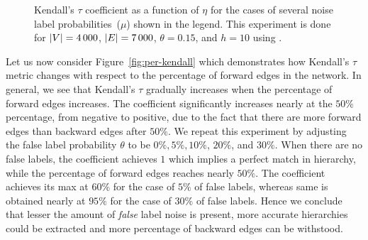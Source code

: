 \begin{figure}[t!]
\begin{center}
\setlength{\tabcolsep}{0pt}

\caption{Kendall's  $\tau$ coefficient  as a function of $\eta$  for the cases of several  noise label probabilities~($\mu$) shown in the legend. This experiment is done for  ${\left|V\right|}=4\,000$, ${\left|E\right|}=7\,000$, $\theta=0.15$, and $h=10$ using \algpartition.}
\label{fig:per-kendall-ind}
\end{center}
\end{figure}

Let us now consider Figure~\ref{fig:per-kendall} which demonstrates how Kendall's $\tau$ metric changes with respect to the percentage of forward edges in the network. In general, we see that Kendall's $\tau$  gradually increases when the percentage of forward edges increases.  The coefficient  significantly increases nearly at the $50\%$ percentage, from negative to positive, due to the fact that there are more forward edges than backward edges after $50\%$. We repeat this experiment by adjusting the false label probability  $\theta$ to be $0\%, 5\%, 10\%$, $20\%$, and $30\%$. When there are no false labels,  the coefficient achieves $1$ which implies a perfect match in hierarchy, while the percentage of forward edges reaches nearly $50\%$. The coefficient  achieves its max at $60\%$ for the case of $5\%$ of false  labels, whereas same is obtained nearly at $95\%$ for the case of $30\%$ of false labels. Hence we  conclude that lesser the amount of \emph{false} label noise is present, more accurate hierarchies could be extracted and more percentage of backward edges can be withstood.

